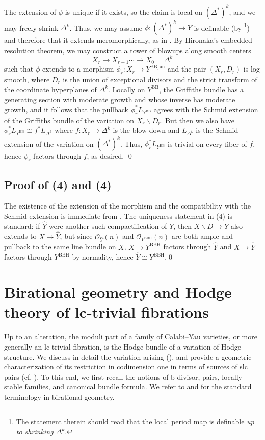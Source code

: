 \documentclass{amsart}
\newcommand{\bs}{\backslash}
\newcommand{\an}{\operatorname{an}}
\theoremstyle{definition}
\theoremstyle{remark}
\def\cO{\mathcal{O}}
\def\an{\mathrm{an}}
\def\BB{\mathrm{BB}}
\def\BBH{\mathrm{BBH}}
\numberwithin{equation}{section}
\begin{document}
The extension of $\phi$ is unique if it exists, so the claim is local on $(\Delta^*)^k$, and we may freely shrink $\Delta^k$.  Thus, we may assume $\phi:(\Delta^*)^k\to Y$ is definable (by \cite[Theorem 4.1]{bkt}\footnote{The statement therein should read that the local period map is definable \emph{up to shrinking $\Delta^k$}.}) and therefore that it extends meromorphically, as in \cite[Lemma 3.2]{bbtmixed}. By Hironaka's embedded resolution theorem, we may construct a tower of blowups along smooth centers $$X_r\to X_{r-1}\cdots\to X_0=\Delta^k$$ such that $\phi$ extends to a morphism $\phi_r:X_r\to Y^{\BB,\an}$ and the pair $(X_r,D_r)$ is log smooth, where $D_r$ is the union of exceptional divisors and the strict transform of the coordinate hyperplanes of $\Delta^k$.  Locally on $Y^\BB$, the Griffiths bundle has a generating section with moderate growth and whose inverse has moderate growth, and it follows that the pullback $\phi_r^*L_{Y^\BB}$ agrees with the Schmid extension of the Griffiths bundle of the variation on $X_r\bs D_r$.  But then we also have $\phi_r^*L_{Y^\BB}\cong f^* L_{\Delta^k}$ where $f:X_r\to \Delta^k$ is the blow-down and $L_{\Delta^k}$ is the Schmid extension of the variation on $(\Delta^*)^k$.  Thus, $\phi_r^*L_{Y^\BB}$ is trivial on every fiber of $f$, hence $\phi_r$ factors through $f$, as desired. \qed

\subsection{Proof of  (4) and  (4)}  The existence of the extension of the morphism and the compatibility with the Schmid extension is immediate from .  The uniqueness statement in (4) is standard:  if $\widehat Y$ were another such compactification of $Y$, then $X\bs D\to Y$ also extends to $X\to {\widehat Y}$, but since $\cO_{{\widehat Y}}(n)$ and $\cO_{Y^\BBH}(n)$ are both ample and pullback to the same line bundle on $X$, $X\to Y^\BBH$ factors through ${\widehat Y}$ and $X\to {\widehat Y}$ factors through $Y^\BBH$ by normality, hence ${\widehat Y}\cong Y^\BBH$.\qed



\section{Birational geometry and Hodge theory of lc-trivial fibrations}
Up to an alteration, the moduli part of a family of Calabi--Yau varieties, or more generally an lc-trivial fibration, is the Hodge bundle of a variation of Hodge structure. We discuss in detail the variation arising (), and provide a geometric characterization of its restriction in codimension one in terms of sources of slc pairs (cf. ). To this end, we first recall the notions of b-divisor, pairs, locally stable families, and canonical bundle formula. We refer to \cite{KM98} and \cite{kol13} for the standard 
terminology in birational geometry.
\end{document}
